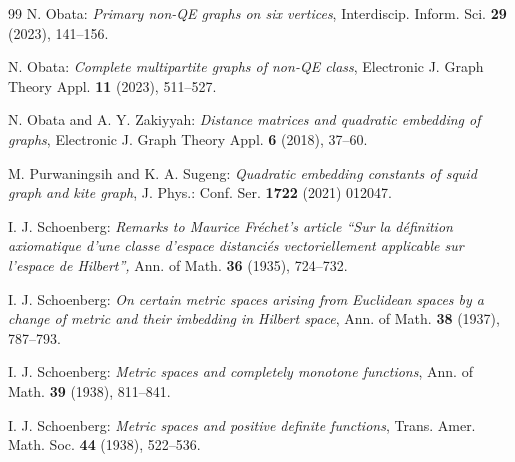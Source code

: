 \documentclass[12pt,a4paper]{article}
\newcommand{\1}{{\bm 1}}
\numberwithin{equation}{section}
\begin{document}
\begin{thebibliography}{99}
N. Obata:
\textit{Primary non-QE graphs on six vertices},
Interdiscip. Inform. Sci. {\bfseries 29} (2023), 141--156.

N. Obata:
\textit{Complete multipartite graphs of non-QE class},
Electronic J. Graph Theory Appl. {\bfseries 11} (2023), 511--527.

N. Obata and A. Y. Zakiyyah:
\textit{Distance matrices and quadratic embedding of graphs},
Electronic J. Graph Theory Appl. {\bfseries 6} (2018), 37--60.

M. Purwaningsih and K. A. Sugeng:
\textit{Quadratic embedding constants of squid graph and kite graph},
J. Phys.: Conf. Ser. {\bfseries 1722} (2021) 012047.

I. J. Schoenberg:
\textit{Remarks to Maurice Fr\'echet's article
``Sur la d\'efinition axiomatique d'une classe d'espace
distanci\'es vectoriellement applicable sur l'espace de Hilbert'',}
Ann. of Math. {\bfseries 36} (1935), 724--732.

I. J. Schoenberg:
\textit{On certain metric spaces arising from Euclidean spaces
by a change of metric and their imbedding in Hilbert space},
Ann. of Math. {\bfseries 38} (1937), 787--793.

I. J. Schoenberg:
\textit{Metric spaces and completely monotone functions},
Ann. of Math. {\bfseries 39} (1938), 811--841.

I. J. Schoenberg:
\textit{Metric spaces and positive definite functions},
Trans. Amer. Math. Soc. {\bfseries 44} (1938), 522--536.

\end{thebibliography}
\end{document}
